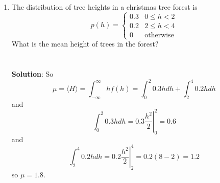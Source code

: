 \documentclass[11pt,a4paper]{scrartcl}
\begin{document}
\begin{enumerate}
\item The distribution of tree heights in a christmas tree forest is 
\begin{equation}
p(h)=\left\{\begin{array}{cc} 0.3& 0\le h <2\\0.2& 2\le h<4\\0&\mbox{otherwise}\end{array}\right.
\end{equation}
What is the mean height of trees in the forest?
\\ \\ \\
\textbf{Solution}: So 
\begin{equation}
\mu =\langle H\rangle=\int_{-\infty}^\infty hf(h)=\int_{0}^2 {0.3h}dh+\int_2^4{0.2h}dh
\end{equation}
and
\begin{equation}
\int_{0}^2 {0.3h}dh=\left.0.3\frac{h^2}{2}\right|_0^2=0.6
\end{equation}
and
\begin{equation}
\int_{2}^4 {0.2h}dh=\left.0.2\frac{h^2}{2}\right|_2^4=0.2 (8-2)=1.2
\end{equation}
so $\mu=1.8$.


\end{enumerate}
\end{document}
